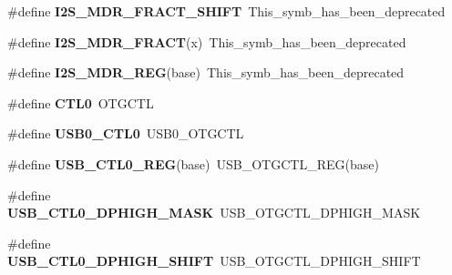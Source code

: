 \begin{DoxyCompactItemize}
\item 
\mbox{\label{group___s_d_k___compatibility___symbols_gab4cc6d27bd245719343b0e868ffb4bb4}} 
\#define {\bfseries I2\+S\+\_\+\+M\+D\+R\+\_\+\+F\+R\+A\+C\+T\+\_\+\+S\+H\+I\+FT}~This\+\_\+symb\+\_\+has\+\_\+been\+\_\+deprecated
\item 
\mbox{\label{group___s_d_k___compatibility___symbols_ga1a70c2cf16e7bfff509b937099b4914b}} 
\#define {\bfseries I2\+S\+\_\+\+M\+D\+R\+\_\+\+F\+R\+A\+CT}(x)~This\+\_\+symb\+\_\+has\+\_\+been\+\_\+deprecated
\item 
\mbox{\label{group___s_d_k___compatibility___symbols_ga7ac76ad60348fc11fad791eb5f111735}} 
\#define {\bfseries I2\+S\+\_\+\+M\+D\+R\+\_\+\+R\+EG}(base)~This\+\_\+symb\+\_\+has\+\_\+been\+\_\+deprecated
\item 
\mbox{\label{group___s_d_k___compatibility___symbols_gacdd0ae658100b07aab693964887967a0}} 
\#define {\bfseries C\+T\+L0}~O\+T\+G\+C\+TL
\item 
\mbox{\label{group___s_d_k___compatibility___symbols_ga3a3c559b7331dd5b7199226cf00e099d}} 
\#define {\bfseries U\+S\+B0\+\_\+\+C\+T\+L0}~U\+S\+B0\+\_\+\+O\+T\+G\+C\+TL
\item 
\mbox{\label{group___s_d_k___compatibility___symbols_ga2d2d33d6e48fae6dc7422a3725f1df86}} 
\#define {\bfseries U\+S\+B\+\_\+\+C\+T\+L0\+\_\+\+R\+EG}(base)~U\+S\+B\+\_\+\+O\+T\+G\+C\+T\+L\+\_\+\+R\+EG(base)
\item 
\mbox{\label{group___s_d_k___compatibility___symbols_ga5b1e6c115a5317b1dc841a0e10fccb2b}} 
\#define {\bfseries U\+S\+B\+\_\+\+C\+T\+L0\+\_\+\+D\+P\+H\+I\+G\+H\+\_\+\+M\+A\+SK}~U\+S\+B\+\_\+\+O\+T\+G\+C\+T\+L\+\_\+\+D\+P\+H\+I\+G\+H\+\_\+\+M\+A\+SK
\item 
\mbox{\label{group___s_d_k___compatibility___symbols_gab2de981a6338133fc884ecdd2639c0ba}} 
\#define {\bfseries U\+S\+B\+\_\+\+C\+T\+L0\+\_\+\+D\+P\+H\+I\+G\+H\+\_\+\+S\+H\+I\+FT}~U\+S\+B\+\_\+\+O\+T\+G\+C\+T\+L\+\_\+\+D\+P\+H\+I\+G\+H\+\_\+\+S\+H\+I\+FT

\end{DoxyCompactItemize}

